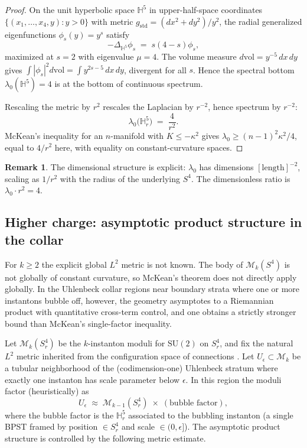\documentclass[11pt,letterpaper]{article}
\theoremstyle{definition}
\newtheorem{remark}[theorem]{Remark}
\newcommand{\bbH}{\mathbb{H}}
\newcommand{\cM}{\mathcal{M}}
\newcommand{\Lap}{\Delta}
\begin{document}
\begin{proof}
On the unit hyperbolic space $\bbH^5$ in upper-half-space coordinates $\{(x_1,\ldots,x_4,y) : y > 0\}$ with metric $g_{\mathrm{std}} = (dx^2+dy^2)/y^2$, the radial generalized eigenfunctions $\phi_s(y) = y^s$ satisfy
\[
-\Lap_{\bbH^5}\phi_s \;=\; s(4-s)\phi_s,
\]
maximized at $s=2$ with eigenvalue $\mu = 4$. The volume measure $d\mathrm{vol} = y^{-5}\,dx\,dy$ gives $\int|\phi_s|^2 d\mathrm{vol} = \int y^{2s-5}\,dx\,dy$, divergent for all $s$. Hence the spectral bottom $\lambda_0(\bbH^5) = 4$ is at the bottom of continuous spectrum.

Rescaling the metric by $r^2$ rescales the Laplacian by $r^{-2}$, hence spectrum by $r^{-2}$:
\[
\lambda_0\bigl(\bbH^5_r\bigr) \;=\; \frac{4}{r^2}.
\]
McKean's inequality for an $n$-manifold with $K \le -\kappa^2$ gives $\lambda_0 \ge (n-1)^2\kappa^2/4$, equal to $4/r^2$ here, with equality on constant-curvature spaces.
\end{proof}

\begin{remark}\label{rmk:radius-units}
The dimensional structure is explicit: $\lambda_0$ has dimensions $[\text{length}]^{-2}$, scaling as $1/r^2$ with the radius of the underlying $S^4$. The dimensionless ratio is $\lambda_0 \cdot r^2 = 4$.
\end{remark}

\subsection{Higher charge: asymptotic product structure in the collar}\label{sec:collar-upgrade}

For $k \ge 2$ the explicit global $L^2$ metric is not known. The body of $\cM_k(S^4)$ is not globally of constant curvature, so McKean's theorem does not directly apply globally. In the Uhlenbeck collar regions near boundary strata where one or more instantons bubble off, however, the geometry asymptotes to a Riemannian product with quantitative cross-term control, and one obtains a strictly stronger bound than McKean's single-factor inequality.

Let $\cM_k(S^4_r)$ be the $k$-instanton moduli for $\mathrm{SU}(2)$ on $S^4_r$, and fix the natural $L^2$ metric inherited from the configuration space of connections \cite{GP1989,Habermann1993}. Let $U_\epsilon \subset \cM_k$ be a tubular neighborhood of the (codimension-one) Uhlenbeck stratum where exactly one instanton has scale parameter below $\epsilon$. In this region the moduli factor (heuristically) as
\[
U_\epsilon \;\approx\; \cM_{k-1}(S^4_r) \;\times\; (\text{bubble factor}),
\]
where the bubble factor is the $\bbH^5_r$ associated to the bubbling instanton (a single BPST framed by position $\in S^4_r$ and scale $\in (0,\epsilon]$). The asymptotic product structure is controlled by the following metric estimate.
\end{document}
